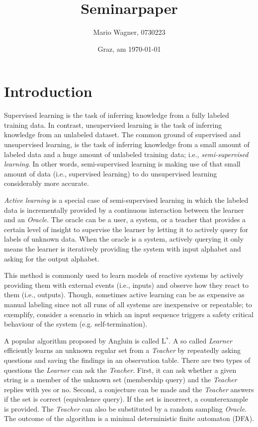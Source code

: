 \documentclass[
a4paper,
12pt
]{scrartcl}
\title{Seminarpaper}
\author{Mario Wagner, 0730223}
\date{Graz, am \today{}}
\begin{document}
 \maketitle
 \tableofcontents
 \listoffigures
 \listoftables

\newpage


\section{Introduction}
Supervised learning is the task of inferring knowledge from a fully labeled training data. In contrast, unsupervised learning is the task of inferring knowledge from an unlabeled dataset. The common ground of supervised and unsupervised learning, is the task of inferring knowledge from a small amount of labeled data and a huge amount of unlabeled training data; i.e., \emph{semi-supervised learning}. In other words, semi-supervised learning is making use of that small amount of data (i.e., supervised learning) to do unsupervised learning considerably more accurate.
\par \emph{Active learning} is a special case of semi-supervised learning in which the labeled data is incrementally provided by a continuous interaction between the learner and an \emph{Oracle}. The oracle can be a user, a system, or a teacher that provides a certain level of insight to supervise the learner by letting it to actively query for labels of unknown data. When the oracle is a system, actively querying it only means the learner is iteratively providing the system with input alphabet and asking for the output alphabet.
\par This method is commonly used to learn models of reactive systems by actively providing them with external events (i.e., inputs) and observe how they react to them (i.e., outputs). Though, sometimes active learning can be as expensive as manual labeling since not all runs of all systems are inexpensive or repeatable; to exemplify, consider a scenario in which an input sequence triggers a safety critical behaviour of the system (e.g. self-termination).
\par A popular algorithm proposed by Angluin\cite{Angluin.1987} is called L$^*$. A so called \textit{Learner} efficiently learns an unknown regular set from a \textit{Teacher} by repeatedly asking questions and saving the findings in an observation table. There are two types of questions the \textit{Learner} can ask the \textit{Teacher}. First, it can ask whether a given string is a member of the unknown set (membership query) and the \textit{Teacher} replies with yes or no. Second, a conjecture can be made and the \textit{Teacher} answers if the set is correct (equivalence query). If the set is incorrect, a counterexample is provided. The \textit{Teacher} can also be substituted by a random sampling \textit{Oracle}. The outcome of the algorithm is a minimal deterministic finite automaton (DFA).
\end{document}
